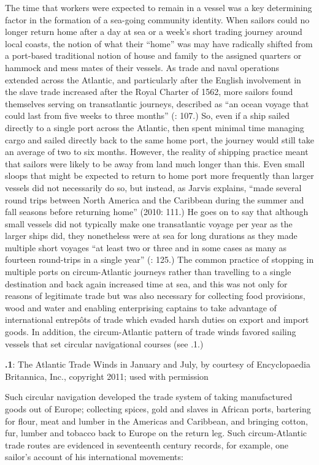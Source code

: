 The time that workers were expected to remain in a vessel was a key determining factor in the formation of a sea-going community identity. When sailors could no longer return home after a day at sea or a week’s short trading journey around local coasts, the notion of what their “home” was may have radically shifted from a port-based traditional notion of house and family to the assigned quarters or hammock and mess mates of their vessels. As trade and naval operations extended across the Atlantic, and particularly after the English involvement in the slave trade increased after the Royal Charter of 1562, more sailors found themselves serving on transatlantic journeys, described as “an ocean voyage that could last from five weeks to three months” (\citealt{Brown2011}: 107.) So, even if a ship sailed directly to a single port across the Atlantic, then spent minimal time managing cargo and sailed directly back to the same home port, the journey would still take an average of two to six months. However, the reality of shipping practice meant that sailors were likely to be away from land much longer than this. Even small sloops that might be expected to return to home port more frequently than larger vessels did not necessarily do so, but instead, as Jarvis explains, “made several round trips between North America and the Caribbean during the summer and fall seasons before returning home” (2010: 111.)  He goes on to say that although small vessels did not typically make one transatlantic voyage per year as the larger ships did, they nonetheless were at sea for long durations as they made multiple short voyages “at least two or three and in some cases as many as fourteen round-trips in a single year” (\citealt{Jarvis2010}: 125.) The common practice of stopping in multiple ports on circum-Atlantic journeys rather than travelling to a single destination and back again increased time at sea, and this was not only for reasons of legitimate trade but was also necessary for collecting food provisions, wood and water and enabling enterprising captains to take advantage of international entrepôts of trade which evaded harsh duties on export and import goods. In addition, the circum-Atlantic pattern of trade winds favored sailing vessels that set circular navigational courses (see .1.) 

\textbf{.1}: The Atlantic Trade Winds in January and July, by courtesy of Encyclopaedia Britannica, Inc., copyright 2011; used with permission

Such circular navigation developed the trade system of taking manufactured goods out of Europe; collecting spices, gold and slaves in African ports, bartering for flour, meat and lumber in the Americas and Caribbean, and bringing cotton, fur, lumber and tobacco back to Europe on the return leg. Such circum-Atlantic trade routes are evidenced in seventeenth century records, for example, one sailor’s account of his international movements:

